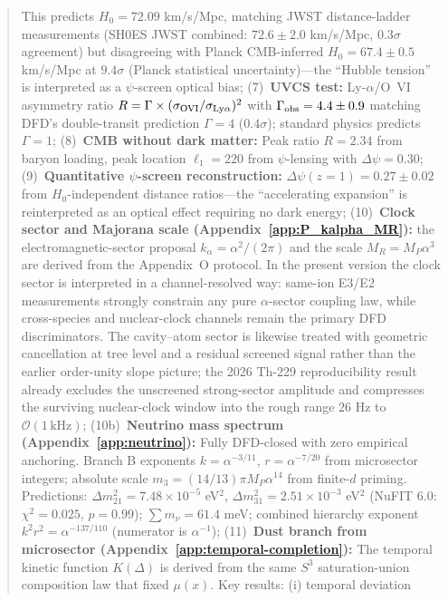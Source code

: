 \documentclass[aps,prd,twocolumn,superscriptaddress,showpacs,floatfix,nofootinbib]{revtex4-2}
\theoremstyle{plain}
\theoremstyle{definition}
\theoremstyle{remark}
\begin{document}
\begin{abstract}
This predicts $H_0 = 72.09$ km/s/Mpc, matching JWST distance-ladder measurements (SH0ES JWST combined: $72.6 \pm 2.0$ km/s/Mpc, $0.3\sigma$ agreement) 
but disagreeing with Planck CMB-inferred $H_0 = 67.4 \pm 0.5$ km/s/Mpc at $9.4\sigma$ (Planck statistical uncertainty)---the ``Hubble tension'' is interpreted as a $\psi$-screen optical bias;
%
(7)~\textbf{UVCS test:} Ly-$\alpha$/O~VI asymmetry ratio $R = \Gamma \times (\sigma_{\rm OVI}/\sigma_{\rm Ly\alpha})^2$ with 
$\Gamma_{\rm obs} = 4.4 \pm 0.9$ matching DFD's double-transit prediction $\Gamma = 4$ ($0.4\sigma$); standard physics predicts $\Gamma = 1$;
%
(8)~\textbf{CMB without dark matter:} Peak ratio $R = 2.34$ from baryon loading, 
peak location $\ell_1 = 220$ from $\psi$-lensing with $\Delta\psi = 0.30$;
%
(9)~\textbf{Quantitative $\psi$-screen reconstruction:} $\Delta\psi(z=1) = 0.27 \pm 0.02$ from $H_0$-independent 
distance ratios---the ``accelerating expansion'' is reinterpreted as an optical effect requiring no dark energy;
%
(10)~\textbf{Clock sector and Majorana scale (Appendix~\ref{app:P_kalpha_MR}):} the electromagnetic-sector proposal $k_\alpha = \alpha^2/(2\pi)$ and the scale $M_R = M_P\alpha^3$ are derived from the Appendix~O protocol. In the present version the clock sector is interpreted in a channel-resolved way: same-ion E3/E2 measurements strongly constrain any pure $\alpha$-sector coupling law, while cross-species and nuclear-clock channels remain the primary DFD discriminators. The cavity--atom sector is likewise treated with geometric cancellation at tree level and a residual screened signal rather than the earlier order-unity slope picture; the 2026 Th-229 reproducibility result already excludes the unscreened strong-sector amplitude and compresses the surviving nuclear-clock window into the rough range $26$ Hz to $\mathcal{O}(1\,\mathrm{kHz})$;
%
(10b)~\textbf{Neutrino mass spectrum (Appendix~\ref{app:neutrino}):} Fully DFD-closed with zero empirical anchoring. 
Branch B exponents $k = \alpha^{-3/11}$, $r = \alpha^{-7/20}$ from microsector integers; absolute scale 
$m_3 = (14/13)\pi M_P\alpha^{14}$ from finite-$d$ priming. Predictions: $\Delta m^2_{21} = 7.48 \times 10^{-5}$ eV$^2$, 
$\Delta m^2_{31} = 2.51 \times 10^{-3}$ eV$^2$ (NuFIT 6.0: $\chi^2 = 0.025$, $p = 0.99$); 
$\sum m_\nu = 61.4$ meV; combined hierarchy exponent $k^2r^2 = \alpha^{-137/110}$ (numerator is $\alpha^{-1}$);
%
(11)~\textbf{Dust branch from microsector (Appendix~\ref{app:temporal-completion}):} The temporal kinetic function $K(\Delta)$ is 
derived from the same $S^3$ saturation-union composition law that fixed $\mu(x)$. Key results: (i) temporal deviation 

\end{abstract}
\end{document}
